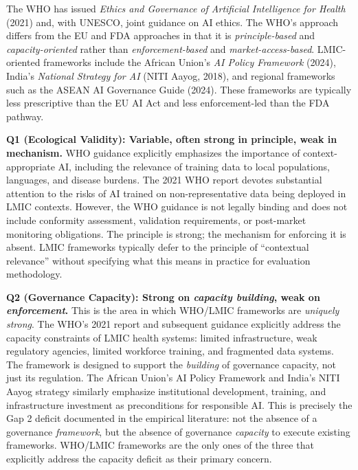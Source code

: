 The WHO has issued \textit{Ethics and Governance of
Artificial Intelligence for Health} (2021) and, with
UNESCO, joint guidance on AI ethics. The WHO's approach
differs from the EU and FDA approaches in that it is
\textit{principle-based} and \textit{capacity-oriented}
rather than \textit{enforcement-based} and
\textit{market-access-based}. LMIC-oriented frameworks
include the African Union's \textit{AI Policy Framework}
(2024), India's \textit{National Strategy for AI}
(NITI Aayog, 2018), and regional frameworks such as the
ASEAN AI Governance Guide (2024). These frameworks are
typically less prescriptive than the EU AI Act and less
enforcement-led than the FDA pathway.

\noindent\textbf{Q1 (Ecological Validity): Variable, often
strong in principle, weak in mechanism.}
WHO guidance explicitly emphasizes the importance of
context-appropriate AI, including the relevance of training
data to local populations, languages, and disease burdens.
The 2021 WHO report devotes substantial attention to the
risks of AI trained on non-representative data being
deployed in LMIC contexts. However, the WHO guidance is
not legally binding and does not include conformity
assessment, validation requirements, or post-market
monitoring obligations. The principle is strong; the
mechanism for enforcing it is absent. LMIC frameworks
typically defer to the principle of ``contextual
relevance'' without specifying what this means in
practice for evaluation methodology.

\noindent\textbf{Q2 (Governance Capacity): Strong on
\textit{capacity building}, weak on \textit{enforcement}.}
This is the area in which WHO/LMIC frameworks are
\textit{uniquely strong}. The WHO's 2021 report and
subsequent guidance explicitly address the capacity
constraints of LMIC health systems: limited
infrastructure, weak regulatory agencies, limited
workforce training, and fragmented data systems. The
framework is designed to support the \textit{building}
of governance capacity, not just its regulation. The
African Union's AI Policy Framework and India's NITI
Aayog strategy similarly emphasize institutional
development, training, and infrastructure investment as
preconditions for responsible AI. This is precisely
the Gap 2 deficit documented in the empirical
literature: not the absence of a governance
\textit{framework}, but the absence of governance
\textit{capacity} to execute existing frameworks.
WHO/LMIC frameworks are the only ones of the three
that explicitly address the capacity deficit as their
primary concern.

